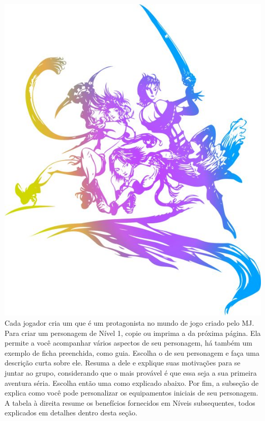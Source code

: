 %
\\\\
%
\includegraphics[width=\columnwidth]{./art/images/ff10-2.jpg}
%
\vfill
%
Cada jogador cria um  que é um protagonista no mundo de jogo criado pelo MJ. 
Para criar um personagem de Nível 1, copie ou imprima a  da próxima página. 
Ela permite a você acompanhar vários aspectos de seu personagem, há também um exemplo de ficha preenchida, como guia. 
Escolha o  de seu personagem e faça uma descrição curta sobre ele. 
Resuma a  dele e explique suas motivações para se juntar ao grupo, considerando que o mais provável é que essa seja a sua primeira aventura séria. 
Escolha então uma  como explicado abaixo. 
Por fim, a subseção de  explica como você pode personalizar os equipamentos iniciais de seu personagem. 
A tabela à direita resume os benefícios fornecidos em Níveis subsequentes, todos explicados em detalhes dentro desta seção.
%
\vfill
